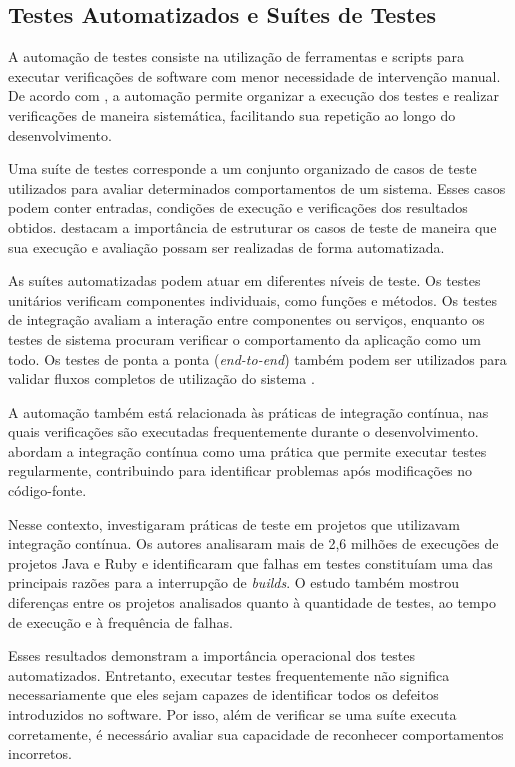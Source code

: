 \subsection{Testes Automatizados e Suítes de Testes}

A automação de testes consiste na utilização de ferramentas e scripts para executar verificações de software com menor necessidade de intervenção manual. De acordo com , a automação permite organizar a execução dos testes e realizar verificações de maneira sistemática, facilitando sua repetição ao longo do desenvolvimento.

Uma suíte de testes corresponde a um conjunto organizado de casos de teste utilizados para avaliar determinados comportamentos de um sistema. Esses casos podem conter entradas, condições de execução e verificações dos resultados obtidos.  destacam a importância de estruturar os casos de teste de maneira que sua execução e avaliação possam ser realizadas de forma automatizada.

As suítes automatizadas podem atuar em diferentes níveis de teste. Os testes unitários verificam componentes individuais, como funções e métodos. Os testes de integração avaliam a interação entre componentes ou serviços, enquanto os testes de sistema procuram verificar o comportamento da aplicação como um todo. Os testes de ponta a ponta (\textit{end-to-end}) também podem ser utilizados para validar fluxos completos de utilização do sistema \cite{ammann2016}.

A automação também está relacionada às práticas de integração contínua, nas quais verificações são executadas frequentemente durante o desenvolvimento.  abordam a integração contínua como uma prática que permite executar testes regularmente, contribuindo para identificar problemas após modificações no código-fonte.

Nesse contexto,  investigaram práticas de teste em projetos que utilizavam integração contínua. Os autores analisaram mais de 2,6 milhões de execuções de projetos Java e Ruby e identificaram que falhas em testes constituíam uma das principais razões para a interrupção de \textit{builds}. O estudo também mostrou diferenças entre os projetos analisados quanto à quantidade de testes, ao tempo de execução e à frequência de falhas.

Esses resultados demonstram a importância operacional dos testes automatizados. Entretanto, executar testes frequentemente não significa necessariamente que eles sejam capazes de identificar todos os defeitos introduzidos no software. Por isso, além de verificar se uma suíte executa corretamente, é necessário avaliar sua capacidade de reconhecer comportamentos incorretos.

